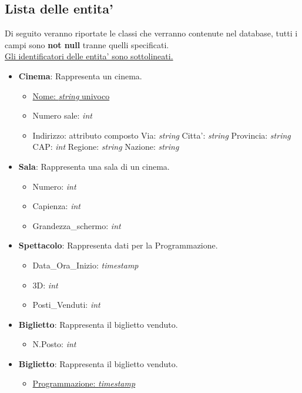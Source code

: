 \documentclass[10pt]{article}
\begin{document}
	\subsection{Lista delle entita'}
	Di seguito veranno riportate le classi che verranno contenute nel database, tutti i campi sono \textbf{not null} tranne quelli specificati.\\
	\underline{Gli identificatori delle entita' sono sottolineati.}
	\begin{itemize}
		\item \textbf{Cinema}: Rappresenta un cinema.
		\begin{itemize}
			\item \underline{Nome: \textit{string} univoco}
			\item Numero sale: \textit{int}
			\item Indirizzo: attributo composto
				\subitem Via: \textit{string}
				\subitem Citta': \textit{string}
				\subitem Provincia: \textit{string}
				\subitem CAP: \textit{int}
				\subitem Regione: \textit{string}
				\subitem Nazione: \textit{string}			
		\end{itemize}
		\item \textbf{Sala}: Rappresenta una sala di un cinema.
		\begin{itemize}
		    \item Numero: \textit{int}
			\item Capienza: \textit{int}
			\item Grandezza\_schermo: \textit{int}
		\end{itemize}
		\item \textbf{Spettacolo}: Rappresenta dati per la Programmazione.
		\begin{itemize}
			\item Data\_Ora\_Inizio: \textit{timestamp}
			\item 3D: \textit{int}
			\item Posti\_Venduti: \textit{int}
		\end{itemize}
		\item \textbf{Biglietto}: Rappresenta il biglietto venduto.
		\begin{itemize}
			\item {N.Posto: \textit{int}}
		\end{itemize}
		\item \textbf{Biglietto}: Rappresenta il biglietto venduto.
		\begin{itemize}
			\item \underline{Programmazione: \textit{timestamp}}

\end{itemize}
\end{itemize}
\end{document}
